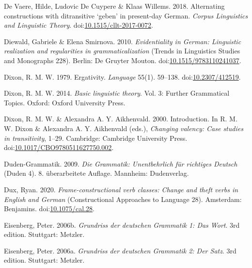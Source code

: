 \leavevmode{}%
De Vaere, Hilde, Ludovic De Cuypere \& Klaas Willems. 2018. Alternating
constructions with ditransitive {`geben'} in present-day {German}.
\emph{Corpus Linguistics and Linguistic Theory}.
doi:\href{https://doi.org/10.1515/cllt-2017-0072}{10.1515/cllt-2017-0072}.

\leavevmode{}%
Diewald, Gabriele \& Elena Smirnova. 2010. \emph{Evidentiality in
{German}: Linguistic realization and regularities in grammaticalization}
(Trends in Linguistics Studies and Monographs 228). Berlin: De Gruyter
Mouton.
doi:\href{https://doi.org/10.1515/9783110241037}{10.1515/9783110241037}.

\leavevmode{}%
Dixon, R. M. W. 1979. Ergativity. \emph{Language} 55(1). 59--138.
doi:\href{https://doi.org/10.2307/412519}{10.2307/412519}.

\leavevmode{}%
Dixon, R. M. W. 2014. \emph{Basic linguistic theory}. Vol. 3: Further
Grammatical Topics. Oxford: Oxford University Press.

\leavevmode{}%
Dixon, R. M. W. \& Alexandra A. Y. Aikhenvald. 2000. Introduction. In R.
M. W. Dixon \& Alexandra A. Y. Aikhenvald (eds.), \emph{Changing
valency: Case studies in transitivity}, 1--29. Cambridge: Cambridge
University Press.
doi:\href{https://doi.org/10.1017/CBO9780511627750.002}{10.1017/CBO9780511627750.002}.

\leavevmode{}%
Duden-Grammatik. 2009. \emph{Die {Grammatik}: Unentbehrlich für
richtiges {Deutsch}} (Duden 4). 8. überarbeitete {Auflage}. Mannheim:
Dudenverlag.

\leavevmode{}%
Dux, Ryan. 2020. \emph{Frame-constructional verb classes: Change and
theft verbs in {English} and {German}} (Constructional Approaches to
Language 28). Amsterdam: Benjamins.
doi:\href{https://doi.org/10.1075/cal.28}{10.1075/cal.28}.

\leavevmode{}%
Eisenberg, Peter. 2006b. \emph{Grundriss der deutschen {Grammatik} 1:
{Das} {Wort}}. 3rd edition. Stuttgart: Metzler.

\leavevmode{}%
Eisenberg, Peter. 2006a. \emph{Grundriss der deutschen {Grammatik} 2:
{Der Satz}}. 3rd edition. Stuttgart: Metzler.

